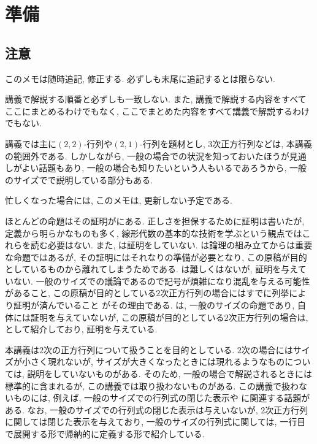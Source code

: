 \chapter{準備}
\section{注意}
このメモは随時追記, 修正する.
必ずしも末尾に追記するとは限らない.

講義で解説する順番と必ずしも一致しない.
また, 講義で解説する内容をすべてここにまとめるわけでもなく,
ここでまとめた内容をすべて講義で解説するわけでもない.

講義では主に$(2,2)$-行列や$(2,1)$-行列を題材とし,
$3$次正方行列などは, 本講義の範囲外である.
しかしながら,
一般の場合での状況を知っておいたほうが見通しがよい話題もあり,
一般の場合も知りたいという人もいるであろうから,
一般のサイズでで説明している部分もある.

忙しくなった場合には,
このメモは,
更新しない予定である.



ほとんどの命題はその証明がにある.
正しさを担保するために証明は書いたが,
定義から明らかなものも多く,
線形代数の基本的な技術を学ぶという観点ではこれらを読む必要はない.
また,
は証明をしていない.
は論理の組み立てからは重要な命題ではあるが,
その証明にはそれなりの準備が必要となり,
この原稿が目的としているものから離れてしまうためである.
は難しくはないが, 証明を与えていない.
一般のサイズでの議論であるので記号が煩雑になり混乱を与える可能性があること,
この原稿が目的としている$2$次正方行列の場合にはすでに列挙により証明が済んでいること
がその理由である.
は, 一般のサイズの命題であり,
自体には証明を与えていないが,
この原稿が目的としている$2$次正方行列の場合は,
として紹介しており,
証明を与えている.



本講義は$2$次の正方行列について扱うことを目的としている.
$2$次の場合にはサイズが小さく現れないが,
サイズが大きくなったときには現れるようなものについては,
説明をしていないものがある.
そのため,
一般の場合で解説されるときには標準的に含まれるが,
この講義では取り扱わないものがある.
この講義で扱わないものには,
例えば,
一般のサイズでの行列式の閉じた表示や
%
%
に関連する話題がある.
なお,
一般のサイズでの行列式の閉じた表示は与えいないが,
$2$次正方行列に関しては閉じた表示を与えており,
一般のサイズの行列式に関しては,
一行目で展開する形で帰納的に定義する形で紹介している.

